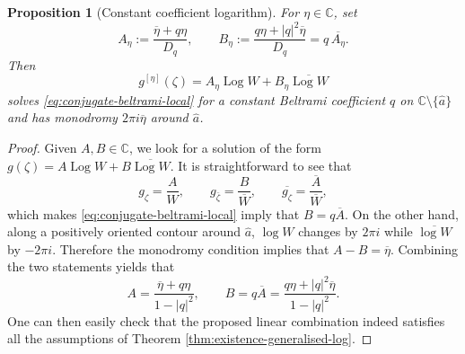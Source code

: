 \documentclass[10pt,a4paper]{amsart}
\newtheorem{prop}{Proposition}
\newcommand\C{\mathbb{C}}
\providecommand{\Log}{\operatorname{Log}}
\providecommand{\hata}{\widehat a}
\begin{document}
\begin{prop}[Constant coefficient logarithm]\label{lem:constant-logarithm}
For $\eta\in\C$, set
\begin{equation}\label{eq:constant-Aeta-Beta}
        A_\eta:=\frac{\overline\eta+q\eta}{D_q},
        \qquad
        B_\eta:=\frac{q\eta+|q|^2\overline\eta}{D_q}
        =q\,\overline{A_\eta}.
\end{equation}
Then
\begin{equation}\label{eq:constant-g-eta}
        g^{[\eta]}(\zeta)
        =A_\eta\Log W+B_\eta\overline{\Log W}
\end{equation}
solves \eqref{eq:conjugate-beltrami-local} for a constant Beltrami coefficient $q$ on $\C\setminus\{\hata\}$ and has monodromy $2\pi i\overline\eta$ around $\hata$.
\end{prop}

\begin{proof}
Given $A,B\in \mathbb{C}$, we look for a solution of the form $ g(\zeta)=A\Log W+B\overline{\Log W}$. It is straightforward to see that 
\begin{equation}\label{eq:constant-proof-derivatives}
        g_\zeta=\frac{A}{W},
        \qquad
        g_{\bar\zeta}=\frac{B}{\overline W},
        \qquad
        \overline{g_\zeta}=\frac{\overline A}{\overline W},
\end{equation}
which makes \eqref{eq:conjugate-beltrami-local} imply that $B=q\overline A$. On the other hand, along a positively oriented contour around $\hata$, $\log W$ changes by $2\pi i$ while $\overline{\log W}$ by $-2\pi i$.  Therefore the monodromy condition implies that $ A-B=\overline\eta$. Combining the two statements yields that 
\begin{equation}\label{eq:constant-proof-A}
        A=\frac{\overline\eta+q\eta}{1-|q|^2},
        \qquad
        B=q\overline A
        =\frac{q\eta+|q|^2\overline\eta}{1-|q|^2}.
\end{equation}
One can then easily check that the proposed linear combination indeed satisfies all the assumptions of Theorem \ref{thm:existence-generalised-log}. 
\end{proof}
\end{document}
